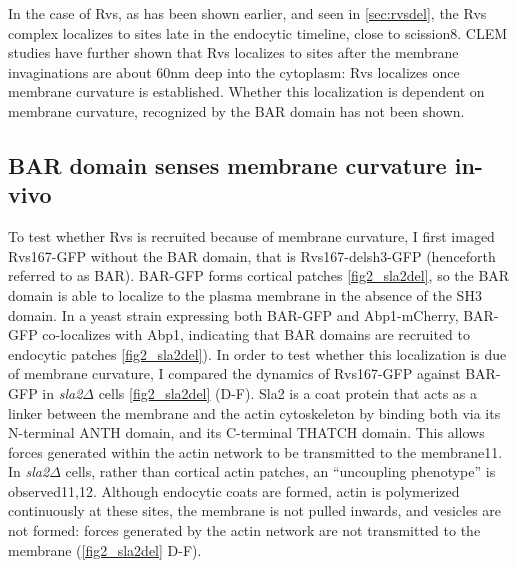 	\vspace{5mm}
	In the case of Rvs, as has been shown earlier, and seen in \ref{sec:rvsdel}, the Rvs complex localizes to sites late in the endocytic timeline, close to scission8. CLEM studies have further shown that Rvs localizes to sites after the membrane invaginations are about 60nm deep into the cytoplasm: Rvs localizes once membrane curvature is established. Whether this localization is dependent on membrane curvature, recognized by the BAR domain has not been shown. 

	\subsection{BAR domain senses membrane curvature in-vivo}
	To test whether Rvs is recruited because of membrane curvature, I first imaged Rvs167-GFP without the BAR domain, that is Rvs167-delsh3-GFP (henceforth referred to as BAR). BAR-GFP forms cortical patches \ref{fig2_sla2del}, so the BAR domain is able to localize to the plasma membrane in the absence of the SH3 domain. In a yeast strain expressing both BAR-GFP and Abp1-mCherry, BAR-GFP co-localizes with Abp1, indicating that BAR domains are recruited to endocytic patches \ref{fig2_sla2del}). In order to test whether this localization is due of membrane curvature, I compared the dynamics of Rvs167-GFP against BAR-GFP in \textit{sla2$\Delta$} cells \ref{fig2_sla2del} (D-F). Sla2 is a coat protein that acts as a linker between the membrane and the actin cytoskeleton by binding both via its N-terminal ANTH domain, and its C-terminal THATCH domain. This allows forces generated within the actin network to be transmitted to the membrane11. In \textit{sla2$\Delta$} cells, rather than cortical actin patches, an “uncoupling phenotype” is observed11,12. Although endocytic coats are formed, actin is polymerized continuously at these sites, the membrane is not pulled inwards, and vesicles are not formed: forces generated by the actin network are not transmitted to the membrane (\ref{fig2_sla2del} D-F).

